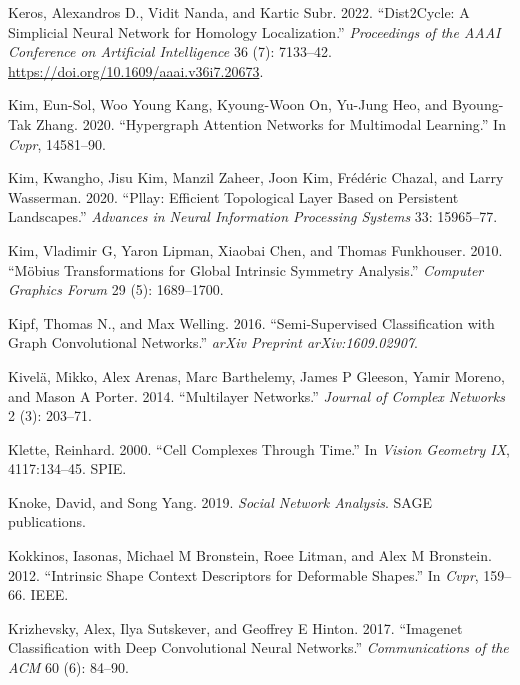 \documentclass[
  12pt,
]{krantz}
\newlength{\cslhangindent}
\newenvironment{CSLReferences}[2] %
 {\begin{list}{}{%
  \setlength{\itemindent}{0pt}
  \setlength{\leftmargin}{0pt}
  \setlength{\parsep}{0pt}
  \ifodd #1
   \setlength{\leftmargin}{\cslhangindent}
   \setlength{\itemindent}{-1\cslhangindent}
  \fi
  \setlength{\itemsep}{#2\baselineskip}}}
 {\end{list}}
\begin{document}
\begin{CSLReferences}{1}{0}
Keros, Alexandros D., Vidit Nanda, and Kartic Subr. 2022. {``Dist2Cycle:
A Simplicial Neural Network for Homology Localization.''}
\emph{Proceedings of the AAAI Conference on Artificial Intelligence} 36
(7): 7133--42. \url{https://doi.org/10.1609/aaai.v36i7.20673}.

Kim, Eun-Sol, Woo Young Kang, Kyoung-Woon On, Yu-Jung Heo, and
Byoung-Tak Zhang. 2020. {``Hypergraph Attention Networks for Multimodal
Learning.''} In \emph{Cvpr}, 14581--90.

Kim, Kwangho, Jisu Kim, Manzil Zaheer, Joon Kim, Frédéric Chazal, and
Larry Wasserman. 2020. {``Pllay: Efficient Topological Layer Based on
Persistent Landscapes.''} \emph{Advances in Neural Information
Processing Systems} 33: 15965--77.

Kim, Vladimir G, Yaron Lipman, Xiaobai Chen, and Thomas Funkhouser.
2010. {``Möbius Transformations for Global Intrinsic Symmetry
Analysis.''} \emph{Computer Graphics Forum} 29 (5): 1689--1700.

Kipf, Thomas N., and Max Welling. 2016. {``Semi-Supervised
Classification with Graph Convolutional Networks.''} \emph{arXiv
Preprint arXiv:1609.02907}.

Kivelä, Mikko, Alex Arenas, Marc Barthelemy, James P Gleeson, Yamir
Moreno, and Mason A Porter. 2014. {``Multilayer Networks.''}
\emph{Journal of Complex Networks} 2 (3): 203--71.

Klette, Reinhard. 2000. {``Cell Complexes Through Time.''} In
\emph{Vision Geometry IX}, 4117:134--45. SPIE.

Knoke, David, and Song Yang. 2019. \emph{Social Network Analysis}. SAGE
publications.

Kokkinos, Iasonas, Michael M Bronstein, Roee Litman, and Alex M
Bronstein. 2012. {``Intrinsic Shape Context Descriptors for Deformable
Shapes.''} In \emph{Cvpr}, 159--66. IEEE.

Krizhevsky, Alex, Ilya Sutskever, and Geoffrey E Hinton. 2017.
{``Imagenet Classification with Deep Convolutional Neural Networks.''}
\emph{Communications of the ACM} 60 (6): 84--90.


\end{CSLReferences}
\end{document}
